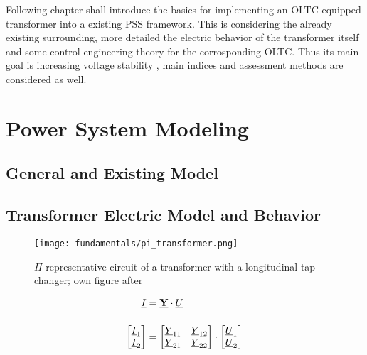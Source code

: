 
Following chapter shall introduce the basics for implementing an \acs{OLTC} equipped transformer into a existing \acs{PSS} framework. This is considering the already existing surrounding, more detailed the electric behavior of the transformer itself and some control engineering theory for the corrosponding \acs{OLTC}. Thus its main goal is increasing voltage stability \autocite{machowskiPowerSystemDynamics2020}, main indices and assessment methods are considered as well.

\section{Power System Modeling}

\subsection{General and Existing Model}

\subsection{Transformer Electric Model and Behavior}

\begin{figure}[h!]
    \centering
    \texttt{[image: fundamentals/pi\_transformer.png]}
    \caption[$\Pi$-representative circuit of a transformer with a longitudinal tap changer]{$\Pi$-representative circuit of a transformer with a longitudinal tap changer; own figure after \autocite{machowskiPowerSystemDynamics2020,burlakinEnhancedVoltageControl2024}}
    \label{fig:pi-transformer}
\end{figure}

\begin{align}
    \underline{I}&=\underline{\mathrm{\textbf{Y}}} \cdot \underline{U} \notag \\[12pt]
    \begin{bmatrix}
        \underline{I}_1 \\
        \underline{I}_2
    \end{bmatrix}&= 
    \begin{bmatrix}
        \underline{Y}_{11} & \underline{Y}_{12} \\
        \underline{Y}_{21} & \underline{Y}_{22}
    \end{bmatrix} \cdot
    \begin{bmatrix}
        \underline{U}_1 \\
        \underline{U}_2
    \end{bmatrix} \label{eq:admittance}
\end{align}

